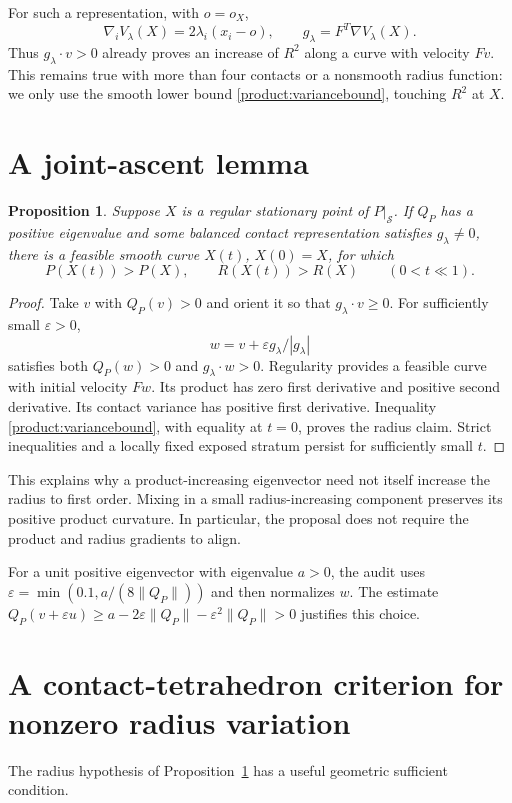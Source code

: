 \documentclass[11pt]{article}
\newtheorem{proposition}[theorem]{Proposition}
\theoremstyle{remark}\newtheorem{remark}[theorem]{Remark}
\begin{document}
For such a representation, with $o=o_X$,
\begin{equation}\label{product:grad}
 \nabla_i V_\lambda(X)=2\lambda_i(x_i-o),\qquad
 g_\lambda=F^T\nabla V_\lambda(X).
\end{equation}
Thus $g_\lambda\cdot v>0$ already proves an increase of $R^2$
along a curve with velocity $Fv$. This remains true with more than four
contacts or a nonsmooth radius function: we only use the smooth lower
bound \eqref{product:variancebound}, touching $R^2$ at $X$.

\section{A joint-ascent lemma}
\begin{proposition}\label{product:joint}
Suppose $X$ is a regular stationary point of $P|_{\mathcal S}$.
If $Q_P$ has a positive eigenvalue and some balanced contact
representation satisfies $g_\lambda\ne0$, there is a feasible smooth
curve $X(t)$, $X(0)=X$, for which
\[
 P(X(t))>P(X),\qquad R(X(t))>R(X)\qquad(0<t\ll1).
\]
\end{proposition}
\begin{proof}
Take $v$ with $Q_P(v)>0$ and orient it so that
$g_\lambda\cdot v\geq0$. For sufficiently small $\varepsilon>0$,
\[
 w=v+\varepsilon g_\lambda/|g_\lambda|
\]
satisfies both $Q_P(w)>0$ and $g_\lambda\cdot w>0$.
Regularity provides a feasible curve with initial velocity $Fw$.
Its product has zero first derivative and positive second derivative.
Its contact variance has positive first derivative. Inequality
\eqref{product:variancebound}, with equality at $t=0$, proves the radius claim.
Strict inequalities and a locally fixed exposed stratum persist for
sufficiently small $t$.
\end{proof}

This explains why a product-increasing eigenvector need not itself
increase the radius to first order. Mixing in a small radius-increasing
component preserves its positive product curvature. In particular,
the proposal does not require the product and radius gradients to align.

For a unit positive eigenvector with eigenvalue $a>0$, the audit uses
$\varepsilon=\min(0.1,a/(8\|Q_P\|))$ and then normalizes $w$.
The estimate
$Q_P(v+\varepsilon u)\geq a-2\varepsilon\|Q_P\|
-\varepsilon^2\|Q_P\|>0$ justifies this choice.

\section{A contact-tetrahedron criterion for nonzero radius variation}
The radius hypothesis of Proposition~\ref{product:joint} has a useful geometric
sufficient condition.
\end{document}
